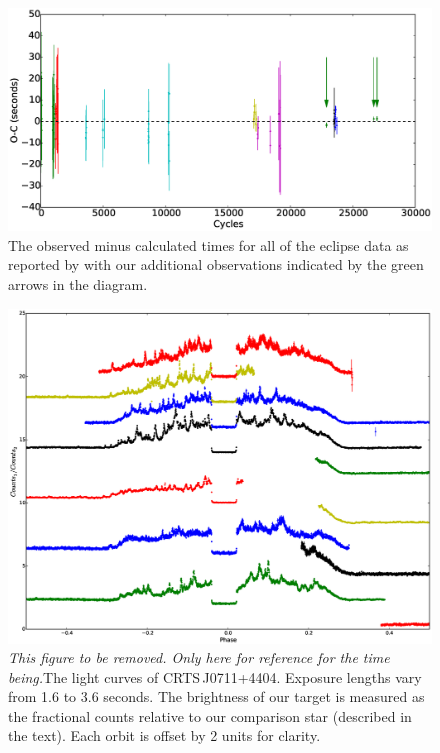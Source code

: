 \documentclass[a4paper,fleqn,usenatbib]{mnras}
\begin{document}
\begin{figure}
	\includegraphics[width=\columnwidth]{images/css081231_oc.eps}
    \caption{The observed minus calculated times for all of the eclipse data as reported by \citet{Schwope2015} with our additional observations indicated by the green arrows in the diagram.  }
    \label{fig:ocdiagram}
\end{figure}

\begin{figure}
\centering
\includegraphics[width=\textwidth]{images/CSS081231_TNT_photometry.eps}
\caption[Caption for photometry]{ \emph{This figure to be removed. Only here for reference for the time being.}The light curves of CRTS\,J0711+4404. Exposure lengths vary from 1.6 to 3.6 seconds. The brightness of our target is measured as the fractional counts relative to our comparison star (described in the text). Each orbit is offset by 2 units for clarity.}
\label{fig:lightcurves}
\end{figure}
\end{document}
